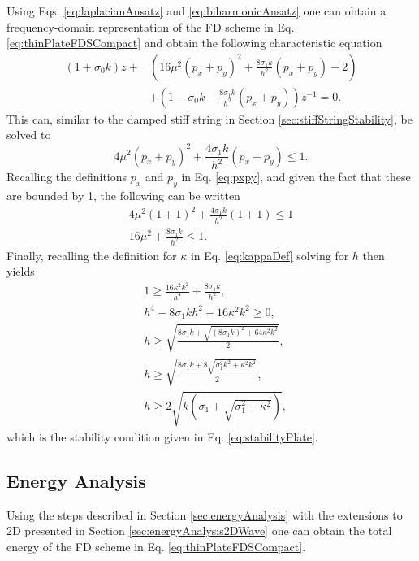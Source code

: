 {Using Eqs. \eqref{eq:laplacianAnsatz} and \eqref{eq:biharmonicAnsatz} one can obtain a frequency-domain representation of the FD scheme in Eq. \eqref{eq:thinPlateFDSCompact}
and obtain the following characteristic equation
\begin{equation}
    \begin{aligned}
        (1+\sigma_0k)z + &\left(16\mu^2(p_x+p_y)^2 + \frac{8\sigma_1k}{h^2}(p_x+p_y) - 2\right) \\
        &+ \left(1 - \sigma_0k - \frac{8\sigma_1k}{h^2}(p_x+p_y)\right)z^{-1} = 0.
    \end{aligned}
\end{equation}
This can, similar to the damped stiff string in Section \ref{sec:stiffStringStability}, be solved to
\begin{equation*}
    4\mu^2(p_x+p_y)^2 + \frac{4\sigma_1k}{h^2}(p_x+p_y) \leq 1.
\end{equation*}
Recalling the definitions $p_x$ and $p_y$ in Eq. \eqref{eq:pxpy}, and given the fact that these are bounded by 1, the following can be written
\begin{gather*}
    4\mu^2(1+1)^2 + \frac{4\sigma_1k}{h^2}(1+1) \leq 1\\
    16\mu^2 + \frac{8\sigma_1k}{h^2} \leq 1.
\end{gather*}
Finally, recalling the definition for $\kappa$ in Eq. \eqref{eq:kappaDef} solving for $h$ then yields
\begin{align}
    &1 \geq \frac{16\kappa^2k^2}{h^4} + \frac{8\sigma_1k}{h^2}\nonumber,\\
    &h^4 - 8\sigma_1kh^2 - 16\kappa^2k^2 \geq 0\nonumber,\\
    &h \geq \sqrt{\frac{8\sigma_1k +\sqrt{(8\sigma_1k)^2 + 64\kappa^2k^2}}{2}}\nonumber,\\
    &h\geq \sqrt{\frac{8\sigma_1k+8\sqrt{\sigma_1^2k^2+\kappa^2k^2}}{2}}\nonumber,\\
    &h \geq 2\sqrt{k\left(\sigma_1 + \sqrt{\sigma_1^2 + \kappa^2}\right)},
\end{align}
which is the stability condition given in Eq. \eqref{eq:stabilityPlate}.

\subsection{Energy Analysis}
Using the steps described in Section \ref{sec:energyAnalysis} with the extensions to 2D presented in Section \ref{sec:energyAnalysis2DWave} one can obtain the total energy of the FD scheme in Eq. \eqref{eq:thinPlateFDSCompact}.
}
